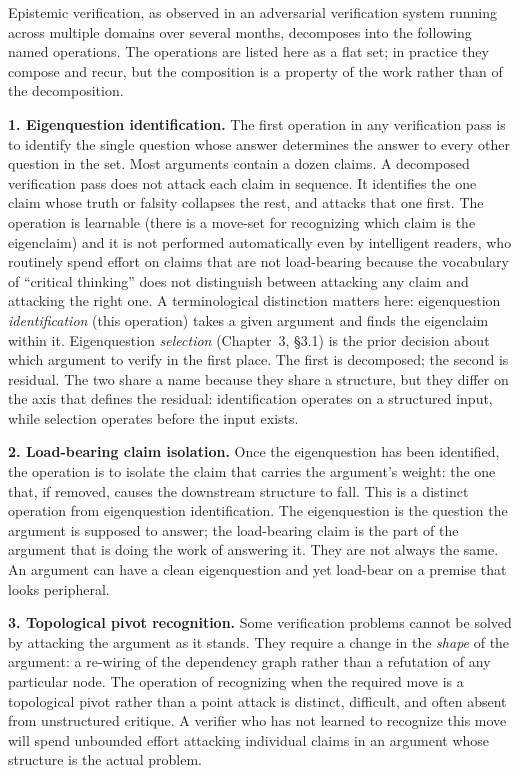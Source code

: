 \documentclass[11pt]{article}
\begin{document}
Epistemic verification, as observed in an adversarial verification system running across multiple domains over several months, decomposes into the following named operations. The operations are listed here as a flat set; in practice they compose and recur, but the composition is a property of the work rather than of the decomposition.

\textbf{1. Eigenquestion identification.} The first operation in any verification pass is to identify the single question whose answer determines the answer to every other question in the set. Most arguments contain a dozen claims. A decomposed verification pass does not attack each claim in sequence. It identifies the one claim whose truth or falsity collapses the rest, and attacks that one first. The operation is learnable (there is a move-set for recognizing which claim is the eigenclaim) and it is not performed automatically even by intelligent readers, who routinely spend effort on claims that are not load-bearing because the vocabulary of ``critical thinking'' does not distinguish between attacking any claim and attacking the right one. A terminological distinction matters here: eigenquestion \emph{identification} (this operation) takes a given argument and finds the eigenclaim within it. Eigenquestion \emph{selection} (Chapter~3, \S3.1) is the prior decision about which argument to verify in the first place. The first is decomposed; the second is residual. The two share a name because they share a structure, but they differ on the axis that defines the residual: identification operates on a structured input, while selection operates before the input exists.

\textbf{2. Load-bearing claim isolation.} Once the eigenquestion has been identified, the operation is to isolate the claim that carries the argument's weight: the one that, if removed, causes the downstream structure to fall. This is a distinct operation from eigenquestion identification. The eigenquestion is the question the argument is supposed to answer; the load-bearing claim is the part of the argument that is doing the work of answering it. They are not always the same. An argument can have a clean eigenquestion and yet load-bear on a premise that looks peripheral.

\textbf{3. Topological pivot recognition.} Some verification problems cannot be solved by attacking the argument as it stands. They require a change in the \emph{shape} of the argument: a re-wiring of the dependency graph rather than a refutation of any particular node. The operation of recognizing when the required move is a topological pivot rather than a point attack is distinct, difficult, and often absent from unstructured critique. A verifier who has not learned to recognize this move will spend unbounded effort attacking individual claims in an argument whose structure is the actual problem.
\end{document}
